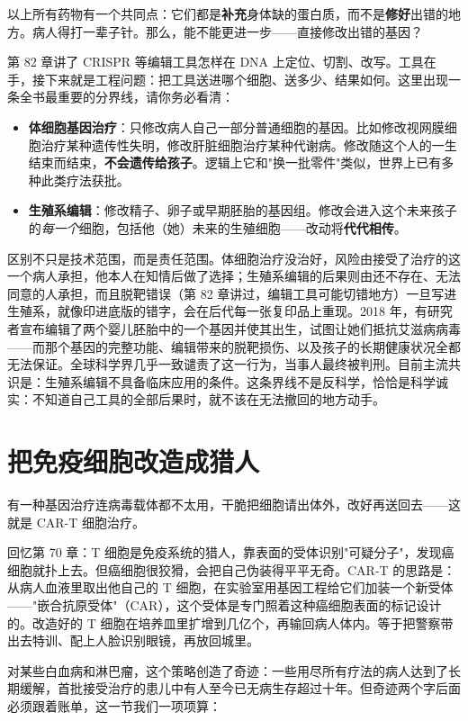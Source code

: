 以上所有药物有一个共同点：它们都是\textbf{补充}身体缺的蛋白质，而不是\textbf{修好}出错的地方。病人得打一辈子针。那么，能不能更进一步——直接修改出错的基因？

第 82 章讲了 CRISPR 等编辑工具怎样在 DNA 上定位、切割、改写。工具在手，接下来就是工程问题：把工具送进哪个细胞、送多少、结果如何。这里出现一条全书最重要的分界线，请你务必看清：

\begin{itemize}[itemsep=2pt]
\item \textbf{体细胞基因治疗}：只修改病人自己一部分普通细胞的基因。比如修改视网膜细胞治疗某种遗传性失明，修改肝脏细胞治疗某种代谢病。修改随这个人的一生结束而结束，\textbf{不会遗传给孩子}。逻辑上它和"换一批零件"类似，世界上已有多种此类疗法获批。
\item \textbf{生殖系编辑}：修改精子、卵子或早期胚胎的基因组。修改会进入这个未来孩子的\emph{每一个}细胞，包括他（她）未来的生殖细胞——改动将\textbf{代代相传}。
\end{itemize}

区别不只是技术范围，而是责任范围。体细胞治疗没治好，风险由接受了治疗的这一个病人承担，他本人在知情后做了选择；生殖系编辑的后果则由还不存在、无法同意的人承担，而且脱靶错误（第 82 章讲过，编辑工具可能切错地方）一旦写进生殖系，就像印进底版的错字，会在后代每一张复印品上重现。2018 年，有研究者宣布编辑了两个婴儿胚胎中的一个基因并使其出生，试图让她们抵抗艾滋病病毒——而那个基因的完整功能、编辑带来的脱靶损伤、以及孩子的长期健康状况全都无法保证。全球科学界几乎一致谴责了这一行为，当事人最终被判刑。目前主流共识是：生殖系编辑不具备临床应用的条件。这条界线不是反科学，恰恰是科学诚实：不知道自己工具的全部后果时，就不该在无法撤回的地方动手。

\section{把免疫细胞改造成猎人}

有一种基因治疗连病毒载体都不太用，干脆把细胞请出体外，改好再送回去——这就是 CAR-T 细胞治疗。

回忆第 70 章：T 细胞是免疫系统的猎人，靠表面的受体识别"可疑分子"，发现癌细胞就扑上去。但癌细胞很狡猾，会把自己伪装得平平无奇。CAR-T 的思路是：从病人血液里取出他自己的 T 细胞，在实验室用基因工程给它们加装一个新受体——"嵌合抗原受体"（CAR），这个受体是专门照着这种癌细胞表面的标记设计的。改造好的 T 细胞在培养皿里扩增到几亿个，再输回病人体内。等于把警察带出去特训、配上人脸识别眼镜，再放回城里。

对某些白血病和淋巴瘤，这个策略创造了奇迹：一些用尽所有疗法的病人达到了长期缓解，首批接受治疗的患儿中有人至今已无病生存超过十年。但奇迹两个字后面必须跟着账单，这一节我们一项项算：

